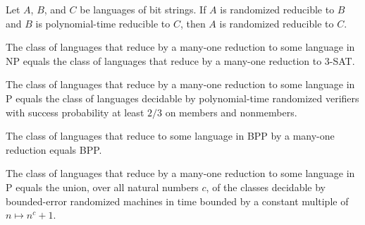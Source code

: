 \begin{theorem}
\label{Randomized.RandReducible.of_polyTimeReducible_right}
\leanok
{}
Let $A$, $B$, and $C$ be languages of bit strings. If $A$ is randomized reducible to $B$
and $B$ is polynomial-time reducible to $C$, then $A$ is randomized reducible to $C$.
\end{theorem}

\begin{theorem}
\label{Randomized.BPdot_NP_eq_BPNP}
\leanok
{}
The class of languages that reduce by a many-one reduction to some language in NP equals
the class of languages that reduce by a many-one reduction to 3-SAT.
\end{theorem}

\begin{theorem}
\label{Randomized.BPdot_P_eq_BPP}
\leanok
{}
The class of languages that reduce by a many-one reduction to some language in P equals
the class of languages decidable by polynomial-time randomized verifiers with success
probability at least $2/3$ on members and nonmembers.
\end{theorem}

\begin{theorem}
\label{Randomized.BPdot_BPP_eq_BPP}
\leanok
{}
The class of languages that reduce to some language in BPP by a many-one reduction
equals BPP.
\end{theorem}

\begin{theorem}
\label{Randomized.BPdot_P_eq_BPP_PTM}
\leanok
{}
The class of languages that reduce by a many-one reduction to some language in P equals
the union, over all natural numbers $c$, of the classes decidable by bounded-error
randomized machines in time bounded by a constant multiple of $n \mapsto n^c+1$.
\end{theorem}
